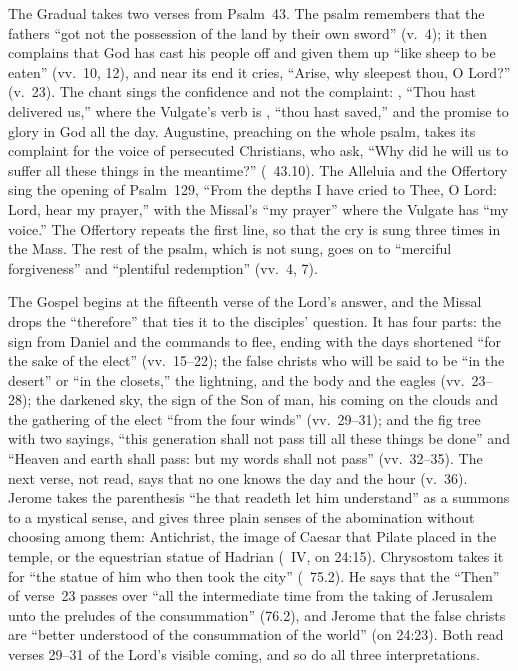 The Gradual takes two verses from Psalm~43. The psalm remembers that the
fathers ``got not the possession of the land by their own sword'' (v.~4); it
then complains that God has cast his people off and given them up ``like
sheep to be eaten'' (vv.~10, 12), and near its end it cries, ``Arise, why
sleepest thou, O Lord?'' (v.~23). The chant sings the confidence and not the
complaint: , ``Thou hast delivered us,'' where the
Vulgate's verb is , ``thou hast saved,'' and the promise to
glory in God all the day. Augustine, preaching on the whole psalm, takes its
complaint for the voice of persecuted Christians, who ask, ``Why did he will
us to suffer all these things in the meantime?'' (~43.10). The Alleluia and the Offertory sing the opening of
Psalm~129, ``From the depths I have cried to Thee, O Lord: Lord, hear my
prayer,'' with the Missal's ``my prayer'' where the Vulgate has ``my voice.''
The Offertory repeats the first line, so that the cry is sung three times in
the Mass. The rest of the psalm, which is not sung, goes on to ``merciful
forgiveness'' and ``plentiful redemption'' (vv.~4, 7).

The Gospel begins at the fifteenth verse of the Lord's answer, and the Missal
drops the ``therefore'' that ties it to the disciples' question. It has four
parts: the sign from Daniel and the commands to flee, ending with the days
shortened ``for the sake of the elect'' (vv.~15--22); the false christs who
will be said to be ``in the desert'' or ``in the closets,'' the lightning,
and the body and the eagles (vv.~23--28); the darkened sky, the sign of the
Son of man, his coming on the clouds and the gathering of the elect ``from
the four winds'' (vv.~29--31); and the fig tree with two sayings, ``this
generation shall not pass till all these things be done'' and ``Heaven and
earth shall pass: but my words shall not pass'' (vv.~32--35). The next verse,
not read, says that no one knows the day and the hour (v.~36). Jerome takes
the parenthesis ``he that readeth let him understand'' as a summons to a
mystical sense, and gives three plain senses of the abomination without
choosing among them: Antichrist, the image of Caesar that Pilate placed in the
temple, or the equestrian statue of Hadrian (~IV, on
24:15). Chrysostom takes it for ``the statue of him who then took the city''
(~75.2). He says that the ``Then'' of verse~23 passes over
``all the intermediate time from the taking of Jerusalem unto the preludes of
the consummation'' (76.2), and Jerome that the false christs are ``better
understood of the consummation of the world'' (on 24:23). Both read verses
29--31 of the Lord's visible coming, and so do all three interpretations.

